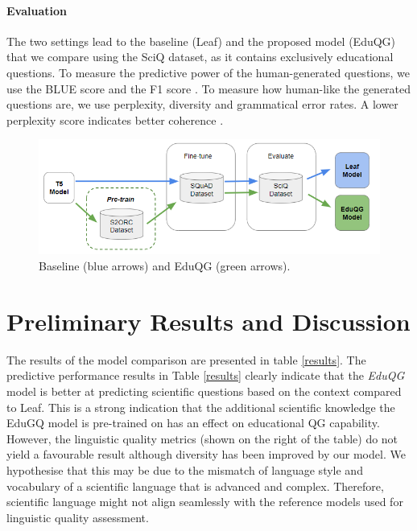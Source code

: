 \documentclass[letterpaper]{article} %
\begin{document}
\paragraph{Evaluation} 
The two settings lead to the baseline (Leaf) and the proposed model (EduQG) that we compare using the SciQ dataset, as it contains exclusively educational questions.
To measure the predictive power of the human-generated questions, we use the BLUE score and the F1 score \cite{DBLP:rajpurkar2016squad}. To measure how human-like the generated questions are, we use perplexity, diversity and grammatical error rates. A lower perplexity score indicates better coherence \cite{wang2022towards}.
\begin{figure}[]
    \centering
    \includegraphics[width=\columnwidth]{methodology_new_v2.png}
    \caption{Baseline (blue arrows) and EduQG (green arrows).}
    \label{fig:method}
\end{figure}

\section{Preliminary Results and Discussion}

The results of the model comparison are presented in table \ref{results}. 
The predictive performance results in Table \ref{results} clearly indicate that the \textit{EduQG} model is better at predicting scientific questions based on the context compared to Leaf. This is a strong indication that the additional scientific knowledge the EduGQ model is pre-trained on has an effect on educational QG capability. However, the linguistic quality metrics (shown on the right of the table) do not yield a favourable result although diversity has been improved by our model. We hypothesise that this may be due to the mismatch of language style and vocabulary of a scientific language that is advanced and complex. Therefore, scientific language might not align seamlessly with the reference models used for linguistic quality assessment. 
\end{document}
